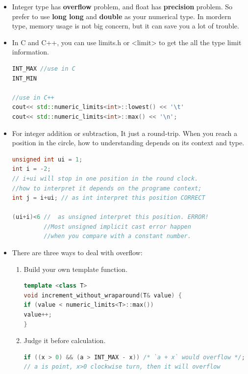 \documentclass[a4paper,12pt,twoside]{book}
\begin{document}
\begin{itemize}
	\item Integer type has \textbf{overflow} problem, and float has \textbf{precision} problem. So prefer to use \textbf{long long} and \textbf{double} as your numerical type. In mordern type, memory usage is not big concern, but it can save you a lot of trouble. 
	
	\item In C and C++, you can use limits.h or <limit> to get the all the type limit information.
	
\begin{lstlisting}[frame=single, language=c++]
INT_MAX //use in C
INT_MIN

//use in C++
cout<< std::numeric_limits<int>::lowest() << '\t'
cout<< std::numeric_limits<int>::max() << '\n';
\end{lstlisting}
	
	\item For integer addition or subtraction, It just a round-trip. When you reach a position in the circle, how to understanding depends on its context and type.
	
\begin{lstlisting}[frame=single, language=c++]
unsigned int ui = 1;
int i = -2;
// i+ui will stop in one position in the round clock.
//how to interpret it depends on the programe context;
int j = i+ui; // as int interpret this position CORRECT

(ui+i)<6 //  as unsigned interpret this position. ERROR!
         //Most unsigned implicit cast error happen 
         //when you compare with a constant number.
\end{lstlisting}
	
	\item There are three ways to deal with overflow:
\begin{enumerate}
		\item Build your own template function.
\begin{lstlisting}[frame=single, language=c++]
template <class T>
void increment_without_wraparound(T& value) {
if (value < numeric_limits<T>::max())
value++;
}
\end{lstlisting}
	
	\item  Judge it before calculation.
\begin{lstlisting}[frame=single, language=c++]
if ((x > 0) && (a > INT_MAX - x)) /* `a + x` would overflow */;
// a is point, x>0 clockwise turn, then it will overflow


\end{lstlisting}
\end{enumerate}
\end{itemize}
\end{document}
